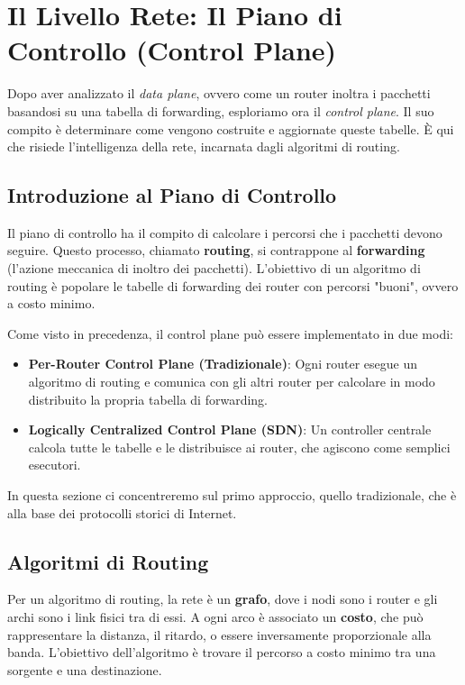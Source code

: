 \chapter{Il Livello Rete: Il Piano di Controllo (Control Plane)}
Dopo aver analizzato il \textit{data plane}, ovvero come un router inoltra i pacchetti basandosi su una tabella di forwarding, esploriamo ora il \textit{control plane}. Il suo compito è determinare come vengono costruite e aggiornate queste tabelle. È qui che risiede l'intelligenza della rete, incarnata dagli algoritmi di routing.

\section{Introduzione al Piano di Controllo}
Il piano di controllo ha il compito di calcolare i percorsi che i pacchetti devono seguire. Questo processo, chiamato \textbf{routing}, si contrappone al \textbf{forwarding} (l'azione meccanica di inoltro dei pacchetti). L'obiettivo di un algoritmo di routing è popolare le tabelle di forwarding dei router con percorsi "buoni", ovvero a costo minimo.

Come visto in precedenza, il control plane può essere implementato in due modi:
\begin{itemize}
    \item \textbf{Per-Router Control Plane (Tradizionale)}: Ogni router esegue un algoritmo di routing e comunica con gli altri router per calcolare in modo distribuito la propria tabella di forwarding.
    \item \textbf{Logically Centralized Control Plane (SDN)}: Un controller centrale calcola tutte le tabelle e le distribuisce ai router, che agiscono come semplici esecutori.
\end{itemize}

In questa sezione ci concentreremo sul primo approccio, quello tradizionale, che è alla base dei protocolli storici di Internet.

\section{Algoritmi di Routing}
Per un algoritmo di routing, la rete è un \textbf{grafo}, dove i nodi sono i router e gli archi sono i link fisici tra di essi. A ogni arco è associato un \textbf{costo}, che può rappresentare la distanza, il ritardo, o essere inversamente proporzionale alla banda. L'obiettivo dell'algoritmo è trovare il percorso a costo minimo tra una sorgente e una destinazione.

